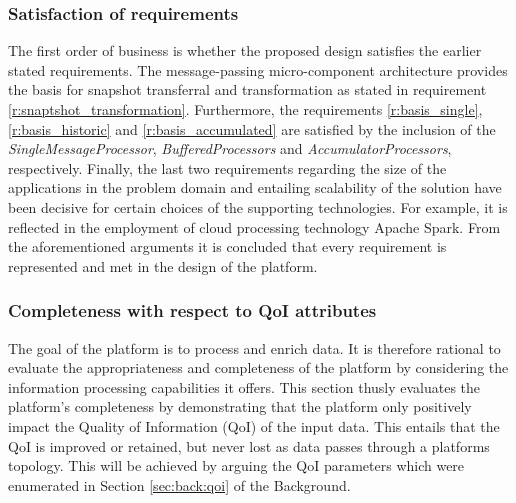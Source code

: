 \subsubsection*{Satisfaction of requirements}
The first order of business is whether the proposed design satisfies the earlier stated requirements. The message-passing micro-component architecture provides the basis for snapshot transferral and transformation as stated in requirement \ref{r:snaptshot_transformation}. Furthermore, the requirements \ref{r:basis_single}, \ref{r:basis_historic} and \ref{r:basis_accumulated} are satisfied by the inclusion of the \emph{SingleMessageProcessor}, \emph{BufferedProcessors} and \emph{AccumulatorProcessors}, respectively. Finally, the last two requirements regarding the size of the applications in the problem domain and entailing scalability of the solution have been decisive for certain choices of the supporting technologies. For example, it is reflected in the employment of cloud processing technology Apache Spark. From the aforementioned arguments it is concluded that every requirement is represented and met in the design of the platform.

\subsubsection*{Completeness with respect to QoI attributes}
The goal of the platform is to process and enrich data. It is therefore rational to evaluate the appropriateness and completeness of the platform by considering the information processing capabilities it offers. This section thusly evaluates the platform's completeness by demonstrating that the platform only positively impact the Quality of Information (QoI) of the input data. This entails that the QoI is improved or retained, but never lost as data passes through a platforms topology. This will be achieved by arguing the QoI parameters which were enumerated in Section \ref{sec:back:qoi} of the Background.


